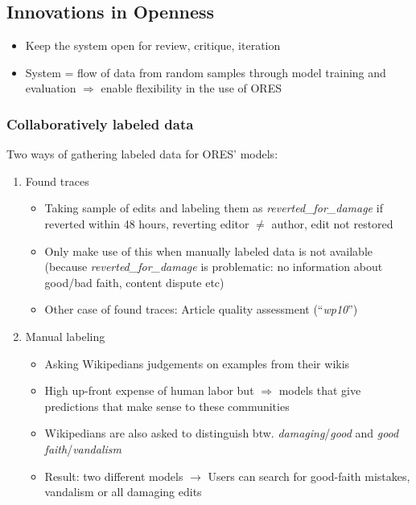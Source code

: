 \documentclass[12pt,a4paper]{article}
\begin{document}
\subsection{Innovations in Openness}
\begin{itemize}
\item Keep the system open for review, critique, iteration
\item System = flow of data from random samples through model training and evaluation
\(\Rightarrow\) enable flexibility in the use of ORES
\end{itemize}


\subsubsection{Collaboratively labeled data}
Two ways of gathering labeled data for ORES' models:
\begin{enumerate}
\item Found traces
\begin{itemize}
\item Taking sample of edits and labeling them as \textit{reverted\_for\_damage} if reverted within 48 hours, reverting editor \(\neq\) author, edit not restored
\item Only make use of this when manually labeled data is not available (because  \textit{reverted\_for\_damage} is problematic: no information about good/bad faith, content dispute etc)
\item Other case of found traces: Article quality assessment (``\textit{wp10}'')
\end{itemize}
\item Manual labeling
\begin{itemize}
\item Asking Wikipedians judgements on examples from their wikis
\item High up-front expense of human labor but \(\Rightarrow\) models that give predictions that make sense to these communities
\item Wikipedians are also asked to distinguish btw. \textit{damaging}/\textit{good} and \textit{good faith}/\textit{vandalism}
\item Result: two different models \(\rightarrow\) Users can search for good-faith mistakes, vandalism or all damaging edits
\end{itemize}
\end{enumerate}
\end{document}
